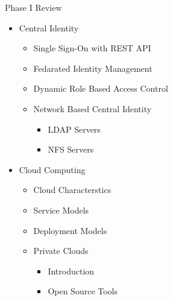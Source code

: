 \documentclass[10pt,xcolor=dvipsnames]{beamer}
\begin{document}
\begin{frame}[allowframebreaks]{Phase I Review }
\begin{itemize}
		\item Central Identity
		\begin{itemize}
			\item Single Sign-On with REST API
			\item Fedarated Identity Management
			\item Dynamic Role Based Access Control
			\item Network Based Central Identity
			\begin{itemize}
				\item LDAP Servers
				\item NFS Servers
			\end{itemize}
		\end{itemize}
		
		\framebreak
		\item Cloud Computing
		\begin{itemize}
			\item Cloud Characterstics
			\item Service Models 
			\item Deployment Models 
			\item Private Clouds 
			\begin{itemize}
			 	\item Introduction 
				\item Open Source Tools 
			\end{itemize}	
		\end{itemize}		 
				

	\end{itemize}
\end{frame}
\end{document}
